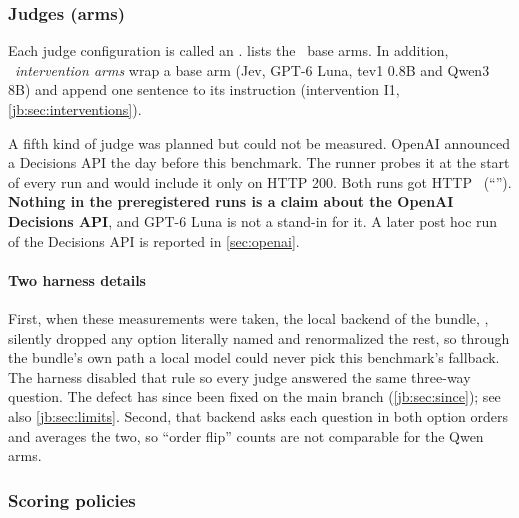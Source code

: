 \subsubsection{Judges (arms)}

Each judge configuration is called an .  lists the \NumBase\ base arms.
In addition, \NumClauseArms\ \emph{intervention arms} wrap a base arm (Jev, GPT-6 Luna, tev1 0.8B and
Qwen3 8B) and append one sentence to its instruction (intervention I1, \cref{jb:sec:interventions}).

\begin{table}[tbp]
\centering\small
\caption{The \NumBase\ base judges. ``Self-reported'' means the model writes its probabilities as text in
a structured answer; they are not the model's internal token probabilities. Local judges have no API
charge; hardware, electricity and memory are not priced.}
\label{jb:tab:arms}

\end{table}

A fifth kind of judge was planned but could not be measured. OpenAI announced a Decisions API the day
before this benchmark. The runner probes it at the start of every run and would include it only on
HTTP 200. Both runs got HTTP \HoldProbeStatus\ (``\HoldProbeMessage''). \textbf{Nothing in the preregistered runs
is a claim about the OpenAI Decisions API}, and GPT-6 Luna is not a stand-in for it. A later post hoc run of the
Decisions API is reported in \cref{sec:openai}.

\paragraph{Two harness details} First, when these measurements were taken, the local backend of the
bundle, , silently dropped any option literally named  and renormalized the
rest, so through the bundle's own path a local model could never pick this benchmark's fallback. The
harness disabled that rule so every judge answered the same three-way question. The defect has since
been fixed on the main branch (\cref{jb:sec:since}); see also \cref{jb:sec:limits}. Second, that backend asks each question in both option orders and averages the two,
so ``order flip'' counts are not comparable for the Qwen arms.

\subsubsection{Scoring policies}

